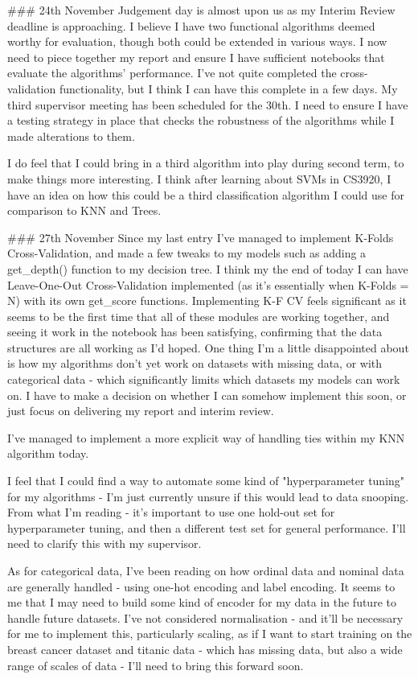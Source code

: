 \documentclass[letterpaper,10pt]{article}
\begin{document}
\begin{markdown}
### 24th November
Judgement day is almost upon us as my Interim Review deadline is approaching. I believe I have two functional algorithms deemed worthy for evaluation, though both could be extended in various ways.  
I now need to piece together my report and ensure I have sufficient notebooks that evaluate the algorithms' performance. I've not quite completed the cross-validation functionality, but I think I can have this complete in a few days.  
My third supervisor meeting has been scheduled for the 30th.  
I need to ensure I have a testing strategy in place that checks the robustness of the algorithms while I made alterations to them.  
  
I do feel that I could bring in a third algorithm into play during second term, to make things more interesting. I think after learning about SVMs in CS3920, I have an idea on how this could be a third classification algorithm I could use for comparison to KNN and Trees.

### 27th November
Since my last entry I've managed to implement K-Folds Cross-Validation, and made a few tweaks to my models such as adding a get_depth() function to my decision tree. I think my the end of today I can have Leave-One-Out Cross-Validation implemented (as it's essentially when K-Folds = N) with its own get_score functions.   
Implementing K-F CV feels significant as it seems to be the first time that all of these modules are working together, and seeing it work in the notebook has been satisfying, confirming that the data structures are all working as I'd hoped.    
One thing I'm a little disappointed about is how my algorithms don't yet work on datasets with missing data, or with categorical data - which significantly limits which datasets my models can work on. I have to make a decision on whether I can somehow implement this soon, or just focus on delivering my report and interim review.
   
I've managed to implement a more explicit way of handling ties within my KNN algorithm today.
  
I feel that I could find a way to automate some kind of "hyperparameter tuning" for my algorithms - I'm just currently unsure if this would lead to data snooping. From what I'm reading - it's important to use one hold-out set for hyperparameter tuning, and then a different test set for general performance. I'll need to clarify this with my supervisor. 

As for categorical data, I've been reading on how ordinal data and nominal data are generally handled - using one-hot encoding and label encoding. It seems to me that I may need to build some kind of encoder for my data in the future to handle future datasets. I've not considered normalisation - and it'll be necessary for me to implement this, particularly scaling, as if I want to start training on the breast cancer dataset and titanic data - which has missing data, but also a wide range of scales of data - I'll need to bring this forward soon.


\end{markdown}
\end{document}
